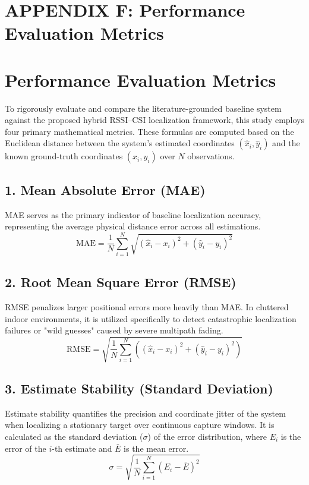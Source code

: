 \clearpage
\section*{APPENDIX F: Performance Evaluation Metrics}

\section{Performance Evaluation Metrics}
\label{app:metrics}

To rigorously evaluate and compare the literature-grounded baseline system against the proposed hybrid RSSI--CSI localization framework, this study employs four primary mathematical metrics. These formulas are computed based on the Euclidean distance between the system's estimated coordinates $(\hat{x}_i, \hat{y}_i)$ and the known ground-truth coordinates $(x_i, y_i)$ over $N$ observations.

\vspace{1em}

\subsection*{1. Mean Absolute Error (MAE)}
MAE serves as the primary indicator of baseline localization accuracy, representing the average physical distance error across all estimations.
\begin{equation}
    \text{MAE} = \frac{1}{N} \sum_{i=1}^{N} \sqrt{(\hat{x}_i - x_i)^2 + (\hat{y}_i - y_i)^2}
\end{equation}

\subsection*{2. Root Mean Square Error (RMSE)}
RMSE penalizes larger positional errors more heavily than MAE. In cluttered indoor environments, it is utilized specifically to detect catastrophic localization failures or "wild guesses" caused by severe multipath fading.
\begin{equation}
    \text{RMSE} = \sqrt{\frac{1}{N} \sum_{i=1}^{N} \left( (\hat{x}_i - x_i)^2 + (\hat{y}_i - y_i)^2 \right)}
\end{equation}

\subsection*{3. Estimate Stability (Standard Deviation)}
Estimate stability quantifies the precision and coordinate jitter of the system when localizing a stationary target over continuous capture windows. It is calculated as the standard deviation ($\sigma$) of the error distribution, where $E_i$ is the error of the $i$-th estimate and $\bar{E}$ is the mean error.
\begin{equation}
    \sigma = \sqrt{\frac{1}{N} \sum_{i=1}^{N} (E_i - \bar{E})^2}
\end{equation}

